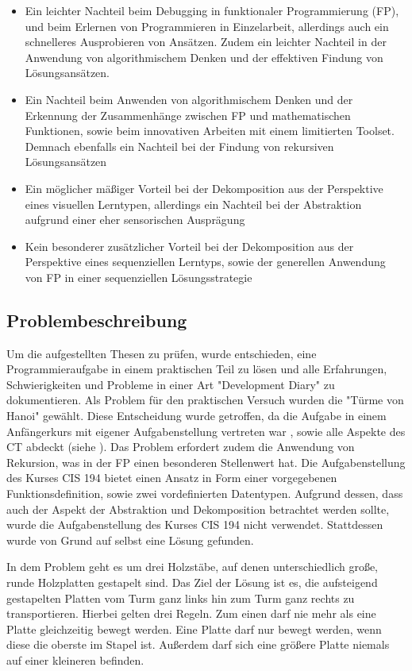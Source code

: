 \begin{itemize}
    \item Ein leichter Nachteil beim Debugging in funktionaler Programmierung (FP), und beim Erlernen von Programmieren in Einzelarbeit, allerdings auch ein schnelleres Ausprobieren von Ansätzen. Zudem ein leichter Nachteil in der Anwendung von algorithmischem Denken und der effektiven Findung von Lösungsansätzen.
    \item Ein Nachteil beim Anwenden von algorithmischem Denken und der Erkennung der Zusammenhänge zwischen FP und mathematischen Funktionen, sowie beim innovativen Arbeiten mit einem limitierten Toolset. Demnach ebenfalls ein Nachteil bei der Findung von rekursiven Lösungsansätzen
    \item Ein möglicher mäßiger Vorteil bei der Dekomposition aus der Perspektive eines visuellen Lerntypen, allerdings ein Nachteil bei der Abstraktion aufgrund einer eher sensorischen Ausprägung
    \item Kein besonderer zusätzlicher Vorteil bei der Dekomposition aus der Perspektive eines sequenziellen Lerntyps, sowie der generellen Anwendung von FP in einer sequenziellen Lösungsstrategie
\end{itemize}

\subsection{Problembeschreibung}\label{sec:problemdesc}
Um die aufgestellten Thesen zu prüfen, wurde entschieden, eine Programmieraufgabe in einem praktischen Teil zu lösen und alle Erfahrungen, Schwierigkeiten und Probleme in einer Art "Development Diary" zu dokumentieren.
Als Problem für den praktischen Versuch wurden die "Türme von Hanoi" gewählt. Diese Entscheidung wurde getroffen, da die Aufgabe in einem Anfängerkurs mit eigener Aufgabenstellung vertreten war \cite{cis194}, sowie alle Aspekte des CT abdeckt (siehe ). Das Problem erfordert zudem die Anwendung von Rekursion, was in der FP einen besonderen Stellenwert hat.
Die Aufgabenstellung des Kurses CIS 194 bietet einen Ansatz in Form einer vorgegebenen Funktionsdefinition, sowie zwei vordefinierten Datentypen. Aufgrund dessen, dass auch der Aspekt der Abstraktion und Dekomposition betrachtet werden sollte, wurde die Aufgabenstellung des Kurses CIS 194 nicht verwendet. Stattdessen wurde von Grund auf selbst eine Lösung gefunden.

In dem Problem geht es um drei Holzstäbe, auf denen unterschiedlich große, runde Holzplatten gestapelt sind. Das Ziel der Lösung ist es, die aufsteigend gestapelten Platten vom Turm ganz links hin zum Turm ganz rechts zu transportieren. Hierbei gelten drei Regeln. Zum einen darf nie mehr als eine Platte gleichzeitig bewegt werden. Eine Platte darf nur bewegt werden, wenn diese die oberste im Stapel ist. Außerdem darf sich eine größere Platte niemals auf einer kleineren befinden.


